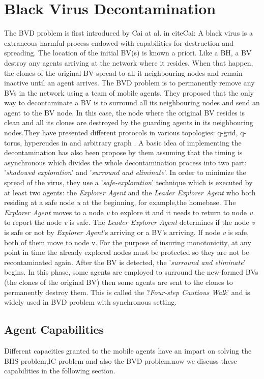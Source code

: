 \section{Black Virus Decontamination}
The BVD problem is first introduced by Cai at al. in cite{Cai}: A black virus is a  extraneous harmful process endowed with capabilities for destruction and spreading. The location of the initial BV(s) is known a priori. Like a BH, a BV destroy any agents arriving at the network where it resides. When that happen, the clones of the original BV spread to all it neighbouring nodes and remain inactive until an agent arrives. The BVD problem is to permanently remove any BVs in the network using a team of mobile agents. They proposed that the only way to decontaminate a BV is to surround all its neighbouring nodes and send an agent to the BV node. In this case, the node where the original BV resides is clean and all its clones are destroyed by the guarding agents in its neighbouring nodes.They have presented different protocols in various topologies: q-grid, q-torus, hypercudes in \cite{Cai} and arbitrary graph \cite{Cai1}. A basic idea of implementing the decontamination has also been propose by them assuming that the timing is asynchronous which divides the whole decontamination process into two part: '{\em shadowed exploration}' and '{\em surround and eliminate}'. In order to minimize the spread of the virus, they use a '{\em safe-exploration}' technique which is executed by at least two agents: the {\em Explorer Agent} and the {\em Leader Explorer Agent} who both residing at a safe node {\em u} at the beginning, for example,the homebase. The {\em Explorer Agent} moves to a node {\em v} to explore it and it needs to return to node {\em u} to report the node {\em v} is safe. The {\em Leader Explorer Agent} determines if the node {\em v} is safe or not by {\em Explorer Agent}'s arriving or a BV's arriving. If node {\em v} is safe, both of them move to node v. For the purpose of insuring monotonicity, at any point in time the already explored nodes must be protected so they are not be recontaminated again. After the BV is detected, the '{\em surround and eliminate}' begins. In this phase, some agents are employed to surround the new-formed BVs (the clones of the original BV) then some agents are sent to the clones to permanently destroy them. This is called the ?{\em Four-step Cautious Walk}' and is widely used in BVD problem with synchronous setting. 

\subsection{Agent Capabilities}
Different capacities granted to the mobile agents have an impart on solving the BHS problem,IC problem and also the BVD problem.now we discuss these capabilities in the following section.
